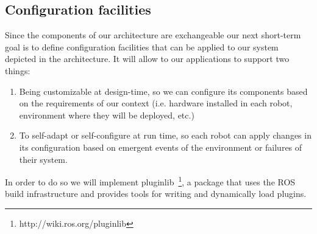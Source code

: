 \subsection{Configuration facilities}

Since the components of our architecture are exchangeable our next short-term goal is to define configuration facilities that can be applied to our system depicted in the architecture.
It will allow to our applications to support two things:

\begin{enumerate}
\item Being customizable at design-time, so we can configure its components based on the requirements of our context (i.e. hardware installed in each robot, environment where they will be deployed, etc.)
\item To self-adapt or self-configure at run time, so each robot can apply changes in its configuration based on emergent events of the environment or failures of their system.
\end{enumerate}

In order to do so we will implement pluginlib~\footnote{http://wiki.ros.org/pluginlib}, a package that uses the ROS build infrastructure and provides tools for writing and dynamically load plugins.



